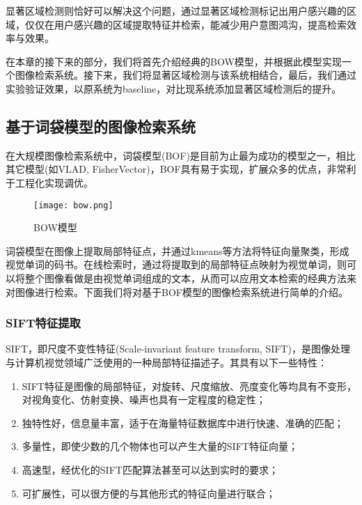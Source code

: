 显著区域检测则恰好可以解决这个问题，通过显著区域检测标记出用户感兴趣的区域，仅仅在用户感兴趣的区域提取特征并检索，能减少用户意图鸿沟，提高检索效率与效果。

在本章的接下来的部分，我们将首先介绍经典的BOW模型，并根据此模型实现一个图像检索系统。接下来，我们将显著区域检测与该系统相结合，最后，我们通过实验验证效果，以原系统为baseline，对比现系统添加显著区域检测后的提升。

\subsection{基于词袋模型的图像检索系统}
在大规模图像检索系统中，词袋模型(BOF)是目前为止最为成功的模型之一\cite{arandjelovic2012three}，相比其它模型(如VLAD\cite{arandjelovic2013all}, FisherVector\cite{perronnin2010large})，BOF具有易于实现，扩展众多的优点，非常利于工程化实现调优。

\begin{figure}
\centering
\texttt{[image: bow.png]}
\caption{BOW模型}
\end{figure}

词袋模型在图像上提取局部特征点，并通过kmeans等方法将特征向量聚类，形成视觉单词的码书。在线检索时，通过将提取到的局部特征点映射为视觉单词，则可以将整个图像看做是由视觉单词组成的文本，从而可以应用文本检索的经典方法来对图像进行检索。下面我们将对基于BOF模型的图像检索系统进行简单的介绍。


\subsubsection{SIFT特征提取}
SIFT，即尺度不变性特征(Scale-invariant feature transform, SIFT)，是图像处理与计算机视觉领域广泛使用的一种局部特征描述子\cite{lowe2004distinctive}。其具有以下一些特性：
\begin{enumerate}
\item SIFT特征是图像的局部特征，对旋转、尺度缩放、亮度变化等均具有不变形，对视角变化、仿射变换、噪声也具有一定程度的稳定性；
\item 独特性好，信息量丰富，适于在海量特征数据库中进行快速、准确的匹配；
\item 多量性，即使少数的几个物体也可以产生大量的SIFT特征向量；
\item 高速型，经优化的SIFT匹配算法甚至可以达到实时的要求；
\item 可扩展性，可以很方便的与其他形式的特征向量进行联合；
\end{enumerate}

